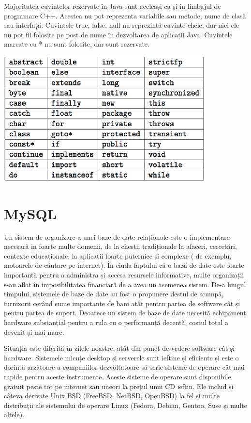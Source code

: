 \documentclass[12pt]{book}
\begin{document}
Majoritatea cuvintelor rezervate în Java sunt aceleași ca și în limbajul de programare C++. Acestea nu pot reprezenta variabile sau metode, nume de clasă sau interfață. Cuvintele true, false, null nu reprezintă cuvinte cheie, dar nici ele nu pot fii folosite pe post de nume în dezvoltarea de aplicații Java. Cuvintele marcate cu * nu sunt folosite, dar sunt rezervate.\\
\begin{center}
	\includegraphics{CuvinteRezervate}
\end{center}

\section{MySQL}
Un sistem de organizare a unei baze de date relaționale este o implementare necesară in foarte multe domenii, de la chestii tradiționale la afaceri, cercetări, contexte educaționale, la aplicații foarte puternice și complexe ( de exemplu, motoarele de căutare pe internet). În ciuda faptului că o bază de date este foarte importantă pentru a administra și accesa resursele informative, multe organizații s-au aflat în imposibilitatea financiară de a avea un asemenea sistem. De-a lungul timpului, sistemele de baze de date au fost o propunere destul de scumpă, furnizorii cerând sume importante de bani atât pentru partea de software cât și pentru partea de suport. Deoarece un sistem de baze de date necesită echipament hardware substanțial pentru a rula cu o performanță decentă, costul total a devenit și mai mare. 

Situația este diferită în zilele noastre, atât din punct de vedere software cât și hardware. Sistemele micuțe desktop și serverele sunt ieftine și eficiente și este o dorintă arzătoare a companiilor dezvoltatoare să scrie sisteme de operare cât mai rapide pentru aceste instrumente. Aceste sisteme de operare sunt disponibile gratuit peste tot pe internet sau uneori la prețul unui CD ieftin. Ele includ și câteva derivate Unix BSD (FreeBSD, NetBSD, OpenBSD) la fel și multe distribuții ale sistemului de operare Linux (Fedora, Debian, Gentoo, Suse și multe altele).
\end{document}
